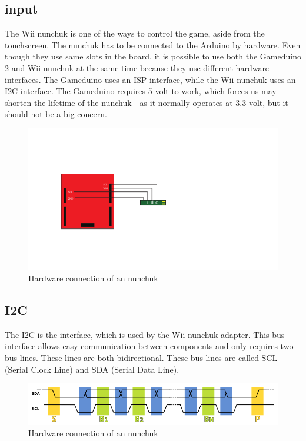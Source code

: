\subsection{input}
The Wii nunchuk is one of the ways to control the game, aside from the
touchscreen.
The nunchuk has to be connected to the Arduino by hardware. Even though they
use same slots in the board, it is possible to use both the Gameduino 2 and Wii
nunchuk at the same time because they use different hardware interfaces. The
Gameduino uses an ISP interface, while the Wii nunchuk uses an I2C interface.
The Gameduino requires 5 volt to work, which forces us may shorten the lifetime
of the nunchuk - as it normally operates at 3.3 volt, but it should not be a
big concern.


\begin{figure}[h]
\centering
\includegraphics{Figures/NunchuckConnection}
\caption{Hardware connection of an nunchuk}
\label{fig:nunchuk_connect}
\end{figure}


\subsection{I2C}
The I2C is the interface, which is used by the Wii nunchuk adapter. This bus
interface allows easy communication between components and only requires two
bus lines. These lines are both bidirectional. These bus lines are called SCL
(Serial Clock Line) and SDA (Serial Data Line).


\begin{figure}[h]
\centering
\includegraphics[scale=0.4]{Figures/I2C}
\caption{Hardware connection of an nunchuk}
\label{fig:i2c}
\end{figure}


